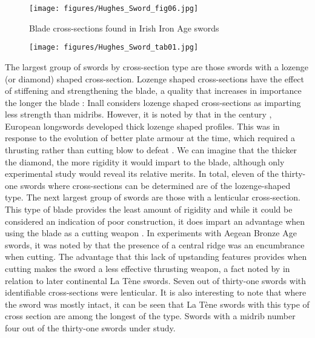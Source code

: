 \begin{wrapfigure}{O}{.5\textwidth}
\texttt{[image: figures/Hughes\_Sword\_fig06.jpg]} 
\caption{Blade cross-sections found in Irish Iron Age swords }
\label{hughes_fig6}
\end{wrapfigure}

\begin{figure}%
\texttt{[image: figures/Hughes\_Sword\_tab01.jpg]} 
\label{tab1}
\end{figure}

	

The largest group of swords by cross-section type are those swords with a lozenge (or diamond) shaped cross-section. 
Lozenge shaped cross-sections have the effect of stiffening and strengthening the blade, a quality that increases in importance the longer the blade \parencite[106]{Inall2009}:
Inall considers lozenge shaped cross-sections as imparting less strength than midribs. 
However, it is noted by \textcite{Oakeshott1960} that in the  century \AD, European longswords developed thick lozenge shaped profiles. 
This was in response to the evolution of better plate armour at the time, which required a thrusting rather than cutting blow to defeat \parencite[301]{Oakeshott1960}. 
We can imagine that the thicker the diamond, the more rigidity it would impart to the blade, although only experimental study would reveal its relative merits. 
In total, eleven of the thirty-one swords where cross-sections can be determined are of the lozenge-shaped type.
The next largest group of swords are those with a lenticular cross-section. 
This type of blade provides the least amount of rigidity and while it could be considered an indication of poor construction, 
it does impart an advantage when using the blade as a cutting weapon \parencite[106]{Inall2009}. 
In experiments with Aegean Bronze Age swords, it was noted by \textcite[124]{Molloy2008} that the presence of a central ridge was an encumbrance when cutting. 
The advantage that this lack of upstanding features provides when cutting makes the sword a less effective thrusting weapon, a fact noted by \textcite[54\psqq]{Oakeshott1960} in relation to later continental La Tène swords. 
Seven out of thirty-one swords with identifiable cross-sections were lenticular. It is also interesting to note that where the sword was mostly intact, it can be seen that La Tène swords with this type of cross section are among the longest of the type.
Swords with a midrib number four out of the thirty-one swords under study. 

